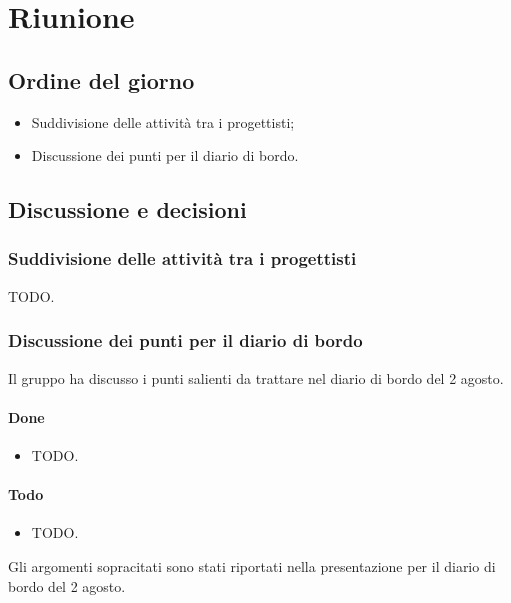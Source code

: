 \section{Riunione}
\subsection{Ordine del giorno}
\begin{itemize}
	\item Suddivisione delle attività tra i progettisti;
	\item Discussione dei punti per il diario di bordo.
\end{itemize}

\subsection{Discussione e decisioni}
\subsubsection{Suddivisione delle attività tra i progettisti}
\par TODO.

\subsubsection{Discussione dei punti per il diario di bordo}
\par Il gruppo ha discusso i punti salienti da trattare nel diario di bordo del 2 agosto.
\paragraph{Done}
\begin{itemize}
	\item TODO.
\end{itemize}

\paragraph{Todo}
\begin{itemize}
	\item TODO.
\end{itemize}

\vspace{0.5\baselineskip}
\par Gli argomenti sopracitati sono stati riportati nella presentazione per il diario di bordo del 2 agosto.